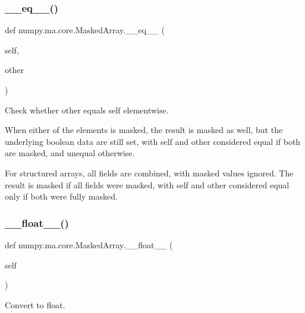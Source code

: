 \subsubsection{\texorpdfstring{\+\_\+\+\_\+eq\+\_\+\+\_\+()}{\_\_eq\_\_()}}
{\footnotesize\ttfamily def numpy.\+ma.\+core.\+Masked\+Array.\+\_\+\+\_\+eq\+\_\+\+\_\+ (\begin{DoxyParamCaption}\item[{}]{self,  }\item[{}]{other }\end{DoxyParamCaption})}

\begin{DoxyVerb}Check whether other equals self elementwise.

When either of the elements is masked, the result is masked as well,
but the underlying boolean data are still set, with self and other
considered equal if both are masked, and unequal otherwise.

For structured arrays, all fields are combined, with masked values
ignored. The result is masked if all fields were masked, with self
and other considered equal only if both were fully masked.
\end{DoxyVerb}
 \mbox{\label{classnumpy_1_1ma_1_1core_1_1MaskedArray_a5aaf0fa1645158598e822499d66e0349}} 
\subsubsection{\texorpdfstring{\+\_\+\+\_\+float\+\_\+\+\_\+()}{\_\_float\_\_()}}
{\footnotesize\ttfamily def numpy.\+ma.\+core.\+Masked\+Array.\+\_\+\+\_\+float\+\_\+\+\_\+ (\begin{DoxyParamCaption}\item[{}]{self }\end{DoxyParamCaption})}

\begin{DoxyVerb}Convert to float.\end{DoxyVerb}
 \mbox{\label{classnumpy_1_1ma_1_1core_1_1MaskedArray_a2591f59e92b5ab00173d9e9b6f909256}} 
